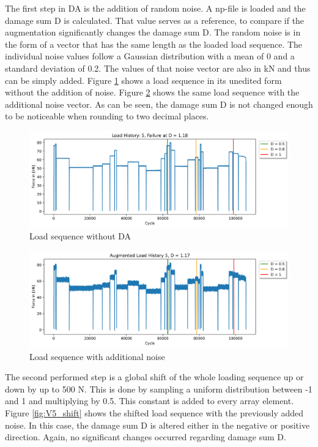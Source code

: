 The first step in DA is the addition of random noise. A np-file is loaded and the damage sum D is calculated. That value serves as a reference, to compare if the augmentation significantly changes the damage sum D.
The random noise is in the form of a vector that has the same length as the loaded load sequence.
The individual noise values follow a Gaussian distribution with a mean of 0 and a standard deviation of 0.2. 
The values of that noise vector are also in kN and thus can be simply added.
Figure \ref{fig:V5} shows a load sequence in its unedited form without the addition of noise. Figure \ref{fig:V5_noise} shows the same load sequence with the additional noise vector. As can be seen, the damage sum D is not changed enough to be noticeable when rounding to two decimal places. 

\begin{figure}[H]
	\centering
	\includegraphics[width=1\linewidth]{IMGs/Verlauf_5.jpg}
	\caption{Load sequence without DA}
	\label{fig:V5}
\end{figure}

\begin{figure}[H]
	\centering
	\includegraphics[width=1\linewidth]{IMGs/Verlauf_5_noise.jpg}
	\caption{Load sequence with additional noise}
	\label{fig:V5_noise}
\end{figure}

The second performed step is a global shift of the whole loading sequence up or down by up to 500 N. This is done by sampling a uniform distribution between -1 and 1 and multiplying by 0.5.  This constant is added to every array element. Figure \ref{fig:V5_shift} shows the shifted load sequence with the previously added noise. In this case, the damage sum D is altered either in the negative or positive direction. Again, no significant changes occurred regarding damage sum D.

